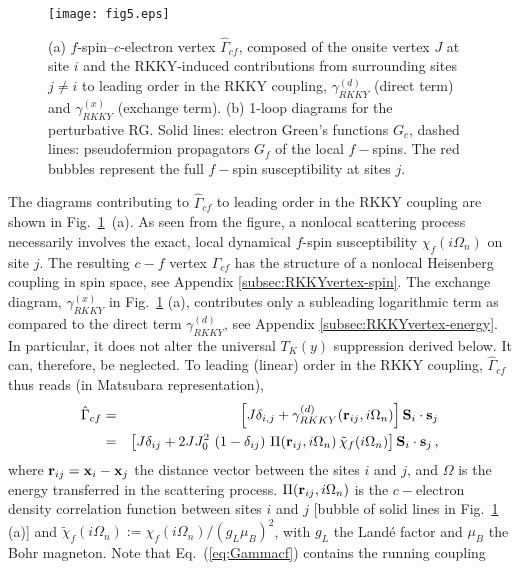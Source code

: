 \documentclass[12pt,twoside]{article}
\newcommand{\Eq}[1]{Eq.~(\ref{#1})}
\begin{document}
    
\begin{figure}[t]
\centering
\texttt{[image: fig5.eps]}
\caption{\label{fig:vertex} 
(a) $f$-spin--$c$-electron vertex $\hat\Gamma_{cf}$, composed of the onsite 
vertex $J$ at site $i$ and the RKKY-induced contributions from 
surrounding sites $j\neq i$ to leading order in the RKKY coupling, 
$\gamma_{RKKY}^{(d)}$ (direct term) and $\gamma_{RKKY}^{(x)}$ (exchange term).   
(b) 1-loop diagrams for the perturbative RG. 
Solid lines: electron Green's functions $G_c$, 
dashed lines: pseudofermion propagators $G_f$ of the local $f-$spins. 
The red bubbles represent the full $f-$spin susceptibility 
at sites $j$.  }
\end{figure}


The diagrams contributing to $\hat\Gamma_{cf}$ to leading order in the 
RKKY coupling are shown in Fig.~\ref{fig:vertex}~(a). 
As seen from the figure, a nonlocal scattering process necessarily 
involves the exact, local dynamical $f$-spin susceptibility $\chi_f(i\Omega_n)$ 
on site $j$. The resulting $c-f$ vertex $\hat\Gamma_{cf}$ has the 
structure of a nonlocal Heisenberg coupling in spin space, see 
Appendix \ref{subsec:RKKYvertex-spin}. 
The exchange diagram, $\gamma_{RKKY}^{(x)}$ in Fig.~\ref{fig:vertex} (a), 
contributes only a subleading logarithmic term as compared to the direct
term $\gamma_{RKKY}^{(d)}$, see Appendix \ref{subsec:RKKYvertex-energy}. 
In particular, it does not alter the universal $T_K(y)$ suppression 
derived below. It can, therefore, be
neglected. To leading (linear) order in the RKKY coupling, 
$\hat\Gamma_{cf}$ thus reads (in Matsubara representation), 
\begin{eqnarray}
\hat\Gamma_{cf} &=& 
\left[ J  \delta_{i,j} + \gamma^{(d)}_{RKKY}({\bf r}_{ij},i\Omega_n)\right] 
{\bf S}_i \cdot {\bf s}_j 
\label{eq:Gammacf}\\ 
&=& \left[ J\delta_{ij}+ 2J J_0^2\ (1-\delta_{ij})\ \Pi({\bf r}_{ij}, i\Omega_n)\, 
\tilde\chi_f(i\Omega_n) \right] 
{\bf S}_i \cdot {\bf s}_j \, ,
\nonumber
\end{eqnarray}
where ${\bf r}_{ij} = {\bf x}_i - {\bf x}_j$ the distance vector 
between the sites $i$ and $j$, and $\Omega$ is the energy transferred in the 
scattering process. $\Pi({\bf r}_{ij}, i\Omega_n)$ is the $c-$electron 
density correlation function between sites $i$ and $j$ [bubble of solid lines 
in Fig.~\ref{fig:vertex} (a)] and 
$\tilde\chi_f(i\Omega_n):=\chi_f(i\Omega_n)/(g_L\mu_B)^2$, with $g_L$ the 
Land\'e factor and $\mu_B$ the Bohr magneton. 
Note that \Eq{eq:Gammacf} contains the running coupling 
\end{document}

